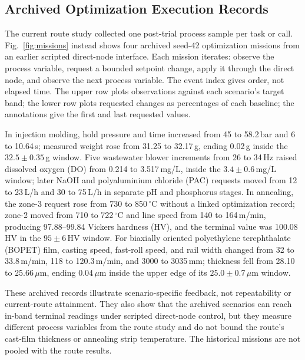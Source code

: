 \subsection{Archived Optimization Execution Records}
\label{sec:historical-scenarios}
The current route study collected one post-trial process sample per task or
call.
Fig.~\ref{fig:missions} instead shows four archived seed-42 optimization
missions from an earlier scripted direct-node interface. Each mission iterates:
observe the process variable, request a bounded setpoint change, apply it
through the direct node, and observe the next process variable. The event index
gives order, not elapsed time. The upper row plots observations against each
scenario's target band; the lower row plots requested changes as percentages of
each baseline; the annotations give the first and last requested values.

In injection molding, hold pressure and time increased from 45 to
58.2\,bar and 6 to 10.64\,s; measured weight rose from 31.25 to 32.17\,g,
ending 0.02\,g inside the $32.5\pm0.35$\,g window. Five wastewater blower
increments from 26 to 34\,Hz raised dissolved oxygen (DO) from 0.214 to
3.517\,mg/L, inside the $3.4\pm0.6$\,mg/L window; later NaOH and
polyaluminium chloride (PAC) requests moved from 12 to 23\,L/h and 30 to
75\,L/h in separate pH and phosphorus stages. In annealing, the zone-3 request
rose from 730 to 850\,$^{\circ}$C without a linked optimization record; zone-2
moved from 710 to 722\,$^{\circ}$C and line speed from 140 to
164\,m/min, producing 97.88--99.84 Vickers hardness (HV), and the terminal
value was 100.08\,HV in the $95\pm6$\,HV window. For biaxially oriented
polyethylene terephthalate (BOPET) film, casting speed, fast-roll speed, and
rail width changed from 32 to 33.8\,m/min, 118 to 120.3\,m/min, and 3000 to
3035\,mm; thickness fell from 28.10 to 25.66\,$\mu$m, ending
0.04\,$\mu$m inside the upper edge of its $25.0\pm0.7$\,$\mu$m window.

These archived records illustrate scenario-specific feedback, not
repeatability or current-route attainment. They also show that the archived
scenarios can reach in-band terminal readings under scripted direct-node
control, but they measure different process variables from the route study and
do not bound the route's cast-film thickness or annealing strip temperature.
The historical missions are not pooled with the route results.

\FloatBarrier

